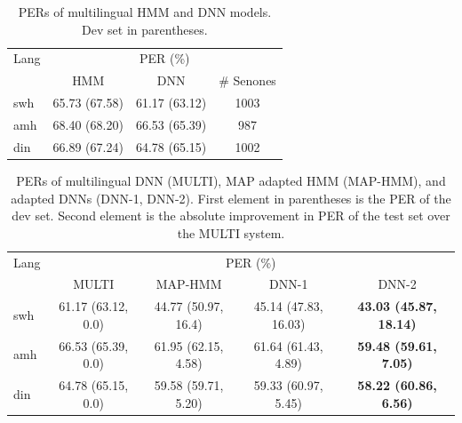 \documentclass[a4paper]{article}
\begin{document}
\begin{table}
\centering %
\caption{PERs of multilingual HMM and DNN models. Dev set in parentheses.}
\begin{tabular}{l|c c c}
   \hline
Lang  & \multicolumn{3}{c}{PER (\%)} \\
          &  HMM & DNN & \# Senones   \\ \hline
swh      &65.73 (67.58)   &61.17 (63.12) & 1003 \\
amh      &68.40 (68.20)   &66.53 (65.39) &  987 \\ 
din     &66.89 (67.24)   &64.78 (65.15) & 1002  \\ \hline
\end{tabular}
\vspace{-7mm}
\label{Tab:PER_Mismatched_Multilingual}
\end{table}


\begin{table}[t]
\centering %
\caption{PERs of multilingual DNN (MULTI), MAP adapted HMM (MAP-HMM), and adapted DNNs (DNN-1, DNN-2). First element in parentheses is the PER of the dev set. Second element is the absolute improvement in PER of the test set over the MULTI system.}
\begin{tabular}{l|c c c c}
   \hline
Lang  & \multicolumn{4}{c}{PER (\%)} \\
        &MULTI        	   &MAP-HMM         		&DNN-1          &DNN-2          \\ \hline
swh      & 61.17 (63.12, 0.0) &44.77 (50.97, 16.4) &45.14 (47.83, 16.03) &\bf{43.03 (45.87, 18.14)}        \\
amh      & 66.53 (65.39, 0.0) &61.95 (62.15, 4.58)  &61.64  (61.43, 4.89)  &\bf{59.48 (59.61, 7.05)}     \\ 
din      &64.78 (65.15, 0.0) &59.58 (59.71, 5.20)  &59.33 (60.97, 5.45)  &\bf{58.22 (60.86, 6.56)}    \\ \hline
\end{tabular}
\vspace{-5mm}
\label{Tab:PER_PT}
\end{table}
\end{document}
